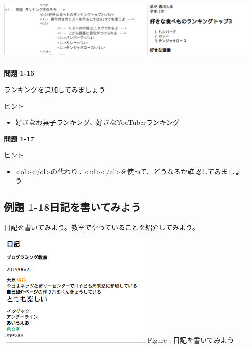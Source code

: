 \documentclass[a4paper,12pt]{jarticle}
\begin{document}
\includegraphics[width=15.905cm,height=3.3cm]{textbook-img184.png}


\bigskip


\bigskip


\bigskip


{\bfseries
  問題 1-16}

ランキングを追加してみましょう

ヒント

\begin{itemize}
  \item
        好きなお菓子ランキング、好きなYouTuberランキング
\end{itemize}


\bigskip

\bigskip

{\bfseries
  問題 1-17}

ヒント

\begin{itemize}
  \item
        {\textless}ol{\textgreater}{\textless}/ol{\textgreater}の代わりに{\textless}ul{\textgreater}{\textless}/ul{\textgreater}を使って、どうなるか確認してみましょう
\end{itemize}



\bigskip

\clearpage\subsection{例題 1-18日記を書いてみよう}
日記を書いてみよう。教室でやっていることを紹介してみよう。

\centering
\begin{minipage}{6.32cm}
  {\upshape
    \includegraphics[width=7.724cm,height=5.643cm]{textbook-img185.png}
    \newline
    Figure : 日記を書いてみよう}
\end{minipage}
\end{document}
